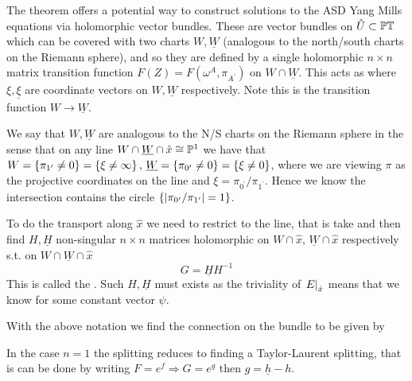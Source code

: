 \documentclass{article}
\begin{document}
The theorem offers a potential way to construct solutions to the ASD Yang Mills equations via holomorphic vector bundles. These are vector bundles on $\hat{U} \subset \mathbb{PT}$ which can be covered with two charts $W, \underline{W}$ (analogous to the north/south charts on the Riemann sphere), and so they are defined by a single holomorphic $n\times n$ matrix transition function $F(Z) = F(\omega^A,\pi_{A^\prime})$ on $W \cap \underline{W}$. This acts as
where $\xi,\underline{\xi}$ are coordinate vectors on $W,\underline{W}$ respectively. Note this is the transition function $W \to \underline{W}$.
\begin{remark}
We say that $W,\underline{W}$ are analogous to the N/S charts on the Riemann sphere in the sense that on any line $W \cap \underline{W} \cap \hat{x} \cong \mathbb{P}^1$ we have that $W = \left\{ \pi_{1^\prime} \neq 0 \right\} = \left\{ \xi \neq \infty \right\}, \, \underline{W} = \left\{ \pi_{0^\prime} \neq 0 \right\} = \left\{ \xi \neq 0 \right\}$, where we are viewing $\pi$ as the projective coordinates on the line and $\xi = \pi_{0^\prime}/\pi_{1^\prime}$. Hence we know the intersection contains the circle $\left\{ \left\lvert \pi_{0^\prime}/\pi_{1^\prime} \right\rvert=1 \right\}$.
\end{remark}
To do the transport along $\hat{x}$ we need to restrict to the line, that is take 
and then find $H, \underline{H}$ non-singular $n\times n$ matrices holomorphic on $W \cap \hat{x}, \, \underline{W} \cap \hat{x}$ respectively s.t. on $W \cap \underline{W} \cap \hat{x}$  
\begin{equation}\label{eq:splitting formula}
G = \underline{H} H^{-1} 
\end{equation}
This is called the . Such $H,\underline{H}$ must exists as the triviality of $\left. E \right\rvert_{\hat{x}}$ means that we know 
for some constant vector $\psi$. 
\begin{prop}
	With the above notation we find the connection on the bundle to be given by 
\end{prop}

\begin{example}\label{ex:splitting formula abelian case}
	In the case $n=1$ the splitting reduces to finding a Taylor-Laurent splitting, that is can be done by writing $F = e^f \Rightarrow G = e^g$ then $g = \underline{h} -h$. 
\end{example}
\end{document}
